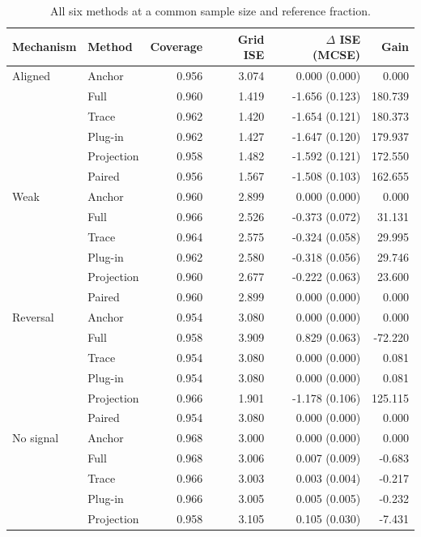 \begin{table}[p]\centering{}
\caption{All six methods at a common sample size and reference fraction.}\label{tab:simulation}
\setlength{\tabcolsep}{3pt}
\begin{tabular}{llrrrr}\toprule
Mechanism & Method & Coverage & Grid ISE & $\Delta$ ISE (MCSE) & Gain \\\midrule
Aligned & Anchor & 0.956 & 3.074 & 0.000 (0.000) & 0.000 \\
 & Full & 0.960 & 1.419 & -1.656 (0.123) & 180.739 \\
 & Trace & 0.962 & 1.420 & -1.654 (0.121) & 180.373 \\
 & Plug-in & 0.962 & 1.427 & -1.647 (0.120) & 179.937 \\
 & Projection & 0.958 & 1.482 & -1.592 (0.121) & 172.550 \\
 & Paired & 0.956 & 1.567 & -1.508 (0.103) & 162.655 \\
\addlinespace[3pt]
Weak & Anchor & 0.960 & 2.899 & 0.000 (0.000) & 0.000 \\
 & Full & 0.966 & 2.526 & -0.373 (0.072) & 31.131 \\
 & Trace & 0.964 & 2.575 & -0.324 (0.058) & 29.995 \\
 & Plug-in & 0.962 & 2.580 & -0.318 (0.056) & 29.746 \\
 & Projection & 0.960 & 2.677 & -0.222 (0.063) & 23.600 \\
 & Paired & 0.960 & 2.899 & 0.000 (0.000) & 0.000 \\
\addlinespace[3pt]
Reversal & Anchor & 0.954 & 3.080 & 0.000 (0.000) & 0.000 \\
 & Full & 0.958 & 3.909 & 0.829 (0.063) & -72.220 \\
 & Trace & 0.954 & 3.080 & 0.000 (0.000) & 0.081 \\
 & Plug-in & 0.954 & 3.080 & 0.000 (0.000) & 0.081 \\
 & Projection & 0.966 & 1.901 & -1.178 (0.106) & 125.115 \\
 & Paired & 0.954 & 3.080 & 0.000 (0.000) & 0.000 \\
\addlinespace[3pt]
No signal & Anchor & 0.968 & 3.000 & 0.000 (0.000) & 0.000 \\
 & Full & 0.968 & 3.006 & 0.007 (0.009) & -0.683 \\
 & Trace & 0.966 & 3.003 & 0.003 (0.004) & -0.217 \\
 & Plug-in & 0.966 & 3.005 & 0.005 (0.005) & -0.232 \\
 & Projection & 0.958 & 3.105 & 0.105 (0.030) & -7.431 \\

\end{tabular}
\end{table}

